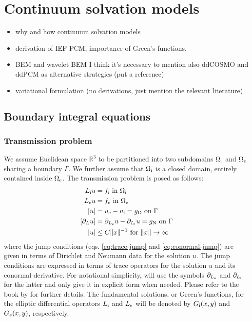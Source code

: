 \chapter{Continuum solvation models}\label{ch:CSM}


\begin{itemize}
    \item why and how continuum solvation models
    \item derivation of \acs{IEF}-\acs{PCM}, importance of Green's
      functions.
    \item \ac{BEM} and wavelet \acs{BEM} I think it's necessary to
      mention also ddCOSMO and ddPCM as alternative strategies (put a
      reference)
    \item variational formulation (no derivations, just mention the
      relevant literature)
\end{itemize}

\pagebreak

\section{Boundary integral equations}\label{sec:BIE}

\subsection{Transmission problem}
We assume Euclidean space $\mathbb{R}^3$ to be partitioned into two
subdomains $\Omega_\mathrm{i}$ and $\Omega_\mathrm{e}$ sharing a boundary $\Gamma$.
We further assume that $\Omega_\mathrm{i}$ is a closed domain, entirely contained inside $\Omega_\mathrm{e}$.
The transmission problem is posed as follows:
\begin{subequations}\label{eq:transmission}
\begin{align}
  L_\mathrm{i} u &= f_\mathrm{i} \,\, \text{in}\,\, \Omega_\mathrm{i} \label{eq:internal} \\
  L_\mathrm{e} u &= f_\mathrm{e} \,\, \text{in}\,\, \Omega_\mathrm{e} \label{eq:external} \\
  [u] &= u_\mathrm{e} - u_\mathrm{i} = g_\mathrm{D} \,\, \text{on}\,\, \Gamma
  \label{eq:trace-jump} \\
[\partial_L u] &= \partial_{L_\mathrm{e}} u - \partial_{L_\mathrm{i}} u = g_\mathrm{N} \,\,
\text{on}\,\, \Gamma \label{eq:conormal-jump} \\
|u| &\leq C \|x \|^{-1} \,\,\text{for}\,\,\| x \|\rightarrow\infty
\label{eq:radiation}
\end{align}
\end{subequations}
where the jump conditions (eqs. \eqref{eq:trace-jump} and
\eqref{eq:conormal-jump}) are given in terms of Dirichlet and Neumann
data for the solution $u$. The jump conditions are expressed in terms of
trace operators for the solution $u$ and its conormal derivative. For
notational simplicity, will use the symbols $\partial_{L_\mathrm{e}}$ and $\partial_{L_\mathrm{i}}$
for the latter and only give it in explicit form when needed. Please
refer to the book by \citeauthor{Sauter2011} for further details. The
fundamental solutions, or Green's functions, for the elliptic
differential operators $L_\mathrm{i}$ and $L_\mathrm{e}$ will be denoted by $G_\mathrm{i}(x, y)$ and
$G_\mathrm{e}(x, y)$, respectively.

